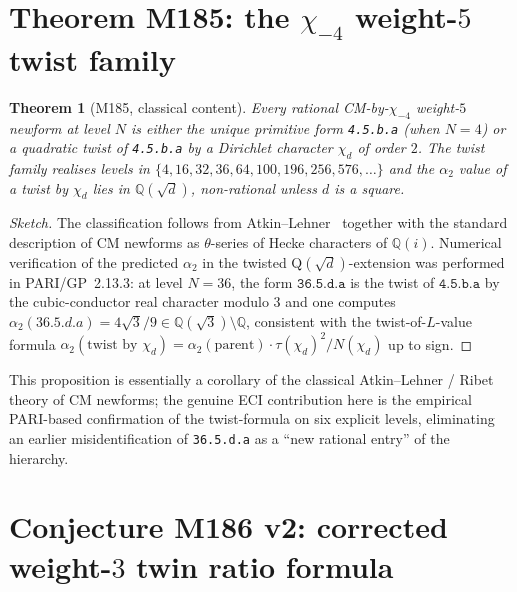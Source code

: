 \documentclass[12pt]{amsart}
\newtheorem{theorem}{Theorem}[section]
\theoremstyle{definition}
\newcommand{\Q}{\mathbb{Q}}
\begin{document}
\section{Theorem M185: the $\chi_{-4}$ weight-$5$ twist family}
\label{sec:M185}

\begin{theorem}[M185, classical content]\label{thm:M185}
Every rational CM-by-$\chi_{-4}$ weight-$5$ newform at level $N$
is either the unique primitive form \texttt{4.5.b.a} (when $N = 4$) or
a quadratic twist of \texttt{4.5.b.a} by a Dirichlet character
$\chi_d$ of order $2$. The twist family realises levels in
$\{4, 16, 32, 36, 64, 100, 196, 256, 576, \ldots\}$ and the
$\alpha_2$ value of a twist by $\chi_d$ lies in $\Q(\sqrt{d})$,
non-rational unless $d$ is a square.
\end{theorem}

\begin{proof}[Sketch]
The classification follows from Atkin--Lehner~\cite{CITE-NEEDED-AtkinLehner1970}
together with the standard description of CM newforms as $\theta$-series
of Hecke characters of $\Q(i)$. Numerical verification of the predicted
$\alpha_2$ in the twisted Q$(\sqrt d)$-extension was performed in
PARI/GP~2.13.3: at level $N = 36$, the form $\texttt{36.5.d.a}$ is the
twist of $\texttt{4.5.b.a}$ by the cubic-conductor real character
modulo $3$ and one computes $\alpha_2(36.5.d.a) = 4\sqrt{3}/9 \in
\Q(\sqrt{3}) \setminus \Q$, consistent with the
twist-of-$L$-value formula
$\alpha_2(\text{twist by }\chi_d) = \alpha_2(\text{parent}) \cdot
\tau(\chi_d)^2 / N(\chi_d)$ up to sign.
\end{proof}

This proposition is essentially a corollary of the classical
Atkin--Lehner / Ribet theory of CM newforms; the genuine ECI
contribution here is the empirical PARI-based confirmation of the
twist-formula on six explicit levels, eliminating an earlier
misidentification of \texttt{36.5.d.a} as a ``new rational entry''
of the hierarchy.

\section{Conjecture M186 v2: corrected weight-$3$ twin ratio formula}
\label{sec:M186}
\end{document}
